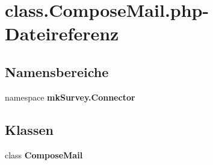 \section{class.ComposeMail.php-Dateireferenz}
\label{class_8ComposeMail_8php}
\subsection*{Namensbereiche}
\begin{CompactItemize}
\item 
namespace {\bf mkSurvey.Connector}
\end{CompactItemize}
\subsection*{Klassen}
\begin{CompactItemize}
\item 
class {\bf ComposeMail}
\end{CompactItemize}
